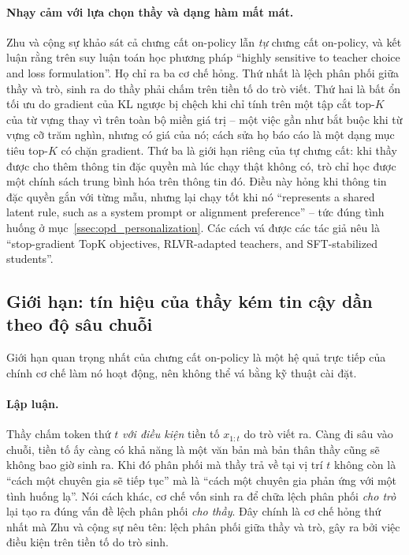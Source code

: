 \paragraph{Nhạy cảm với lựa chọn thầy và dạng hàm mất mát.} Zhu và cộng sự \cite{zhu2026manyfaces} khảo sát cả chưng cất on-policy lẫn \emph{tự} chưng cất on-policy, và kết luận rằng trên suy luận toán học phương pháp ``highly sensitive to teacher choice and loss formulation''. Họ chỉ ra ba cơ chế hỏng. Thứ nhất là lệch phân phối giữa thầy và trò, sinh ra do thầy phải chấm trên tiền tố do trò viết. Thứ hai là bất ổn tối ưu do gradient của KL ngược bị chệch khi chỉ tính trên một tập cắt top-$K$ của từ vựng thay vì trên toàn bộ miền giá trị -- một việc gần như bắt buộc khi từ vựng cỡ trăm nghìn, nhưng có giá của nó; cách sửa họ báo cáo là một dạng mục tiêu top-$K$ có chặn gradient. Thứ ba là giới hạn riêng của tự chưng cất: khi thầy được cho thêm thông tin đặc quyền mà lúc chạy thật không có, trò chỉ học được một chính sách trung bình hóa trên thông tin đó. Điều này hỏng khi thông tin đặc quyền gắn với từng mẫu, nhưng lại chạy tốt khi nó ``represents a shared latent rule, such as a system prompt or alignment preference'' -- tức đúng tình huống ở mục~\ref{ssec:opd_personalization}. Các cách vá được các tác giả nêu là ``stop-gradient TopK objectives, RLVR-adapted teachers, and SFT-stabilized students''.

\subsection{Giới hạn: tín hiệu của thầy kém tin cậy dần theo độ sâu chuỗi}
\label{ssec:opd_limits}

Giới hạn quan trọng nhất của chưng cất on-policy là một hệ quả trực tiếp của chính cơ chế làm nó hoạt động, nên không thể vá bằng kỹ thuật cài đặt.

\paragraph{Lập luận.} Thầy chấm token thứ $t$ \emph{với điều kiện} tiền tố $x_{1:t}$ do trò viết ra. Càng đi sâu vào chuỗi, tiền tố ấy càng có khả năng là một văn bản mà bản thân thầy cũng sẽ không bao giờ sinh ra. Khi đó phân phối mà thầy trả về tại vị trí $t$ không còn là ``cách một chuyên gia sẽ tiếp tục'' mà là ``cách một chuyên gia phản ứng với một tình huống lạ''. Nói cách khác, cơ chế vốn sinh ra để chữa lệch phân phối \emph{cho trò} lại tạo ra đúng vấn đề lệch phân phối \emph{cho thầy}. Đây chính là cơ chế hỏng thứ nhất mà Zhu và cộng sự \cite{zhu2026manyfaces} nêu tên: lệch phân phối giữa thầy và trò, gây ra bởi việc điều kiện trên tiền tố do trò sinh.

